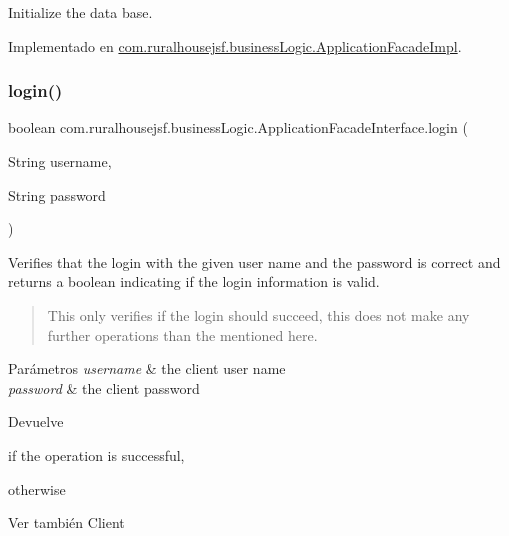 Initialize the data base. 



Implementado en \mbox{\hyperlink{a00132_a1e6cbb70c9568899c86135b3264b431d}{com.\+ruralhousejsf.\+business\+Logic.\+Application\+Facade\+Impl}}.

\mbox{\label{a00136_a75cc2d20f7df7b8872333cca281bf343}} 
\subsubsection{\texorpdfstring{login()}{login()}}
{\footnotesize\ttfamily boolean com.\+ruralhousejsf.\+business\+Logic.\+Application\+Facade\+Interface.\+login (\begin{DoxyParamCaption}\item[{String}]{username,  }\item[{String}]{password }\end{DoxyParamCaption})}



Verifies that the login with the given user name and the password is correct and returns a boolean indicating if the login information is valid. 

\begin{quote}
This only verifies if the login should succeed, this does not make any further operations than the mentioned here. \end{quote}



\begin{DoxyParams}{Parámetros}
{\em username} & the client user name \\
\hline
{\em password} & the client password\\
\hline
\end{DoxyParams}
\begin{DoxyReturn}{Devuelve}

\begin{DoxyCode}{0}
\DoxyCodeLine{\textcolor{keyword}{true} }
\end{DoxyCode}
 if the operation is successful,
\begin{DoxyCode}{0}
\DoxyCodeLine{\textcolor{keyword}{false} }
\end{DoxyCode}
 otherwise
\end{DoxyReturn}
\begin{DoxySeeAlso}{Ver también}
Client 
\end{DoxySeeAlso}


